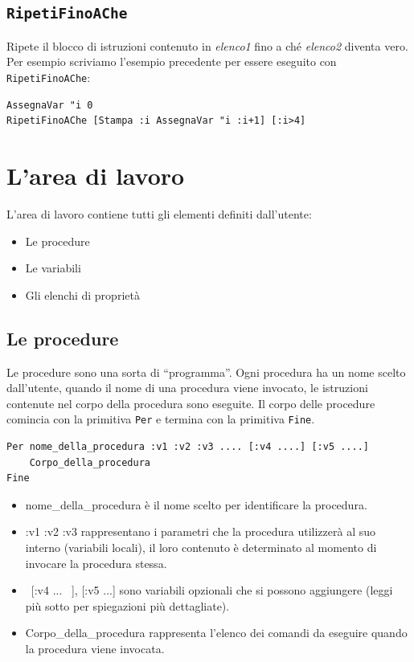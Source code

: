 \subsection{\texttt{RipetiFinoAChe}}
\noindent 
{}
Ripete il blocco di istruzioni contenuto in \textit{elenco1} fino a ché \textit{elenco2} diventa vero.
Per esempio scriviamo l'esempio precedente per essere eseguito con \texttt{RipetiFinoAChe}:
\begin{lstlisting}[caption="Esempio di ciclo con condizione (falsa) alla fine"]
AssegnaVar "i 0
RipetiFinoAChe [Stampa :i AssegnaVar "i :i+1] [:i>4]
\end{lstlisting}



\section{L'area di lavoro}
L'area di lavoro contiene tutti gli elementi definiti dall'utente:
\begin{itemize}
	\item Le procedure
	\item Le variabili
	\item Gli elenchi di proprietà
\end{itemize}
 
\subsection{Le procedure}
Le procedure sono una sorta di ``programma''. Ogni procedura ha un nome scelto dall'utente, quando il nome di una procedura viene invocato, le istruzioni contenute nel corpo della procedura sono eseguite. Il corpo delle procedure comincia con la primitiva \texttt{Per} e termina con la primitiva \texttt{Fine}.\\

   
\begin{lstlisting}[caption="Sintassi di una procedura"]
Per nome_della_procedura :v1 :v2 :v3 .... [:v4 ....] [:v5 ....]
	Corpo_della_procedura
Fine
\end{lstlisting}

\noindent 
\begin{itemize}
	\item nome\_della\_procedura è il nome scelto per identificare la procedura.
	\item :v1 :v2 :v3 rappresentano i parametri che la procedura utilizzerà al suo interno (variabili locali), il loro contenuto è determinato al momento di invocare la procedura stessa.
	\item\ [:v4 ... \ ], [:v5 ...] sono variabili opzionali che si possono aggiungere (leggi più sotto per spiegazioni più dettagliate).
	\item Corpo\_della\_procedura rappresenta l'elenco dei comandi da eseguire quando la procedura viene invocata.\\
\end{itemize}


